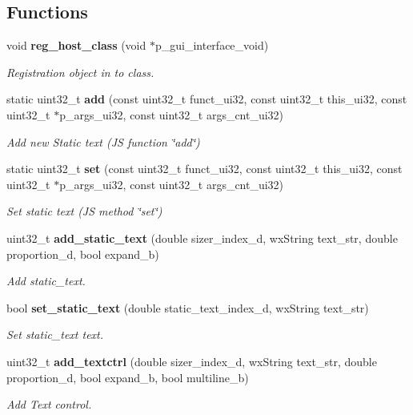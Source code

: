 \subsection*{Functions}
\begin{DoxyCompactItemize}
\item 
void \textbf{ reg\+\_\+host\+\_\+class} (void $\ast$p\+\_\+gui\+\_\+interface\+\_\+void)
\begin{DoxyCompactList}\small\item\em Registration object in to class. \end{DoxyCompactList}\item 
static uint32\+\_\+t \textbf{ add} (const uint32\+\_\+t funct\+\_\+ui32, const uint32\+\_\+t this\+\_\+ui32, const uint32\+\_\+t $\ast$p\+\_\+args\+\_\+ui32, const uint32\+\_\+t args\+\_\+cnt\+\_\+ui32)
\begin{DoxyCompactList}\small\item\em Add new Static text (JS function \char`\"{}add\char`\"{}) \end{DoxyCompactList}\item 
static uint32\+\_\+t \textbf{ set} (const uint32\+\_\+t funct\+\_\+ui32, const uint32\+\_\+t this\+\_\+ui32, const uint32\+\_\+t $\ast$p\+\_\+args\+\_\+ui32, const uint32\+\_\+t args\+\_\+cnt\+\_\+ui32)
\begin{DoxyCompactList}\small\item\em Set static text (JS method \char`\"{}set\char`\"{}) \end{DoxyCompactList}\item 
uint32\+\_\+t \textbf{ add\+\_\+static\+\_\+text} (double sizer\+\_\+index\+\_\+d, wx\+String text\+\_\+str, double proportion\+\_\+d, bool expand\+\_\+b)
\begin{DoxyCompactList}\small\item\em Add static\+\_\+text. \end{DoxyCompactList}\item 
bool \textbf{ set\+\_\+static\+\_\+text} (double static\+\_\+text\+\_\+index\+\_\+d, wx\+String text\+\_\+str)
\begin{DoxyCompactList}\small\item\em Set static\+\_\+text text. \end{DoxyCompactList}\item 
uint32\+\_\+t \textbf{ add\+\_\+textctrl} (double sizer\+\_\+index\+\_\+d, wx\+String text\+\_\+str, double proportion\+\_\+d, bool expand\+\_\+b, bool multiline\+\_\+b)
\begin{DoxyCompactList}\small\item\em Add Text control. \end{DoxyCompactList}\item 

\end{DoxyCompactItemize}
